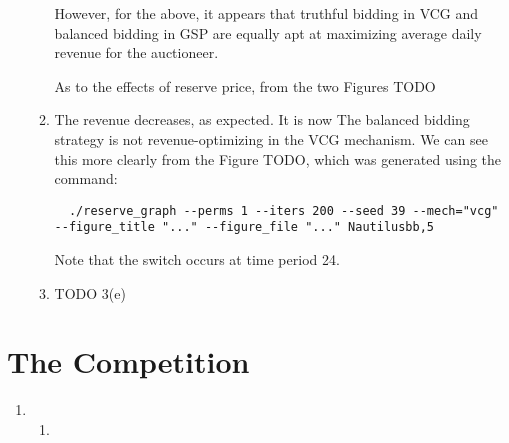 \documentclass[11pt]{article}
\begin{document}
\begin{enumerate}[resume]
\begin{enumerate}
  However, for the above, it appears that truthful bidding in VCG and balanced bidding in GSP are equally apt at maximizing average daily revenue for the auctioneer. 

  As to the effects of reserve price, from the two Figures TODO

  \item The revenue decreases, as expected. It is now  The balanced bidding strategy is not revenue-optimizing in the VCG mechanism. We can see this more clearly from the Figure TODO, which was generated using the command:
   \begin{lstlisting}
  ./reserve_graph --perms 1 --iters 200 --seed 39 --mech="vcg" --figure_title "..." --figure_file "..." Nautilusbb,5
  \end{lstlisting}

  Note that the switch occurs at time period 24.
  \item TODO 3(e)
  \end{enumerate}
\end{enumerate}

\section*{The Competition}
\begin{enumerate}[resume]
\item
  \begin{enumerate}
  \item 
  \end{enumerate}
\end{enumerate}
\end{document}
